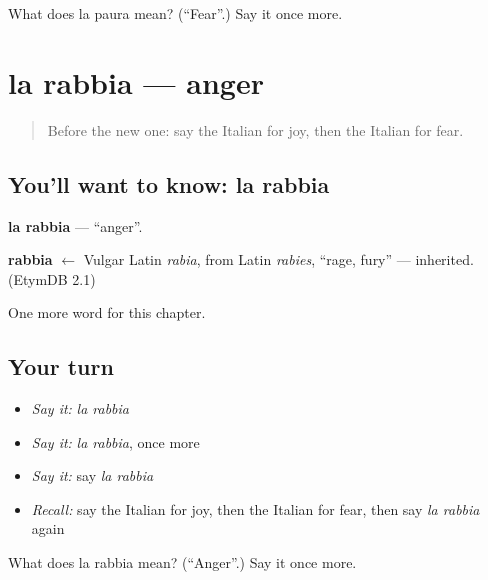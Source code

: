 \begin{tcolorbox}[breakable,colback=teal!4,colframe=teal!35!black,title={Before you move on}]
What does la paura mean? (\textquotedblleft{}Fear\textquotedblright{}.) Say it once more.
\end{tcolorbox}
\section[la rabbia]{la rabbia — anger}

\label{lesson:IT-C43-rabbia}



\begin{quote}
Before the new one: say the Italian for joy, then the Italian for fear.
\end{quote}

\subsection*{You'll want to know: la rabbia}
\textbf{la rabbia} — \textquotedblleft{}anger\textquotedblright{}.

\begin{cousinweb}
\textbf{rabbia} $\leftarrow$ Vulgar Latin \emph{rabia}, from Latin \emph{rabies}, \textquotedblleft{}rage, fury\textquotedblright{} — inherited. (EtymDB 2.1)
\end{cousinweb}

\begin{grammarlens}[title={What you've built}]
One more word for this chapter.
\end{grammarlens}

\subsection*{Your turn}
\begin{itemize}
\raggedright
  \item \emph{Say it:} \emph{la rabbia}
  \item \emph{Say it:} \emph{la rabbia}, once more
  \item \emph{Say it:} say \emph{la rabbia}
  \item \emph{Recall:} say the Italian for joy, then the Italian for fear, then say \emph{la rabbia} again
\end{itemize}

\begin{tcolorbox}[breakable,colback=teal!4,colframe=teal!35!black,title={Before you move on}]
What does la rabbia mean? (\textquotedblleft{}Anger\textquotedblright{}.) Say it once more.
\end{tcolorbox}
